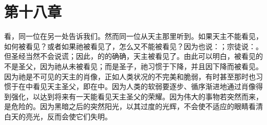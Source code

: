
\section{第十八章}

\par

看，同一位在另一处告诉我们。然而同一位从天主那里听到。如果天主不能看见，如何被看见？或者如果祂被看见了，怎么又不能被看见？因为也说：；宗徒说：。但圣经当然不会说谎；因此，的的确确，天主被看见了。由此可以明白，被看见的不是圣父，因为祂从未被看见；而是圣子，祂习惯于下降，并且因下降而被看见。因为祂是不可见的天主的肖像，正如人类状况的不完美和脆弱，有时甚至那时也习惯于在中看见天主圣父，即在中。因为人类的软弱要逐步、循序渐进地通过肖像得到强化，以达到将来有一天能看见天主圣父的荣耀。因为伟大的事物若突然而来，是危险的。因为黑暗之后的突然阳光，以其过度的光辉，不会使不适应的眼睛看清白天的亮光，反而会使它们失明。\par

